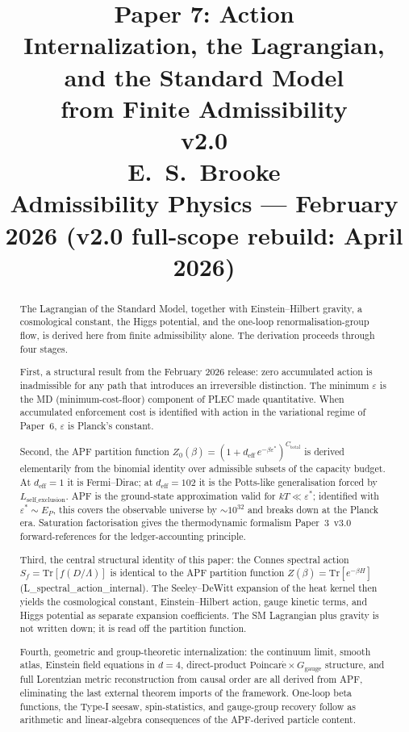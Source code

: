 \documentclass[11pt]{article}
\title{
  \textbf{Paper 7: Action}\\
  \large Internalization, the Lagrangian, and the Standard Model\\
  \large from Finite Admissibility\\
  \normalsize v2.0\\
  \normalsize E.\ S.\ Brooke\\
  Admissibility Physics --- February 2026 (v2.0 full-scope rebuild: April 2026)
}
\author{}
\date{}
\theoremstyle{definition}
\begin{document}
\maketitle

\begin{abstract}
\noindent
The Lagrangian of the Standard Model, together with Einstein--Hilbert gravity, a cosmological constant, the Higgs potential, and the one-loop renormalisation-group flow, is derived here from finite admissibility alone.  The derivation proceeds through four stages.

First, a structural result from the February 2026 release: zero accumulated action is inadmissible for any path that introduces an irreversible distinction.  The minimum $\varepsilon$ is the MD (minimum-cost-floor) component of PLEC made quantitative.  When accumulated enforcement cost is identified with action in the variational regime of Paper~6, $\varepsilon$ is Planck's constant.

Second, the APF partition function $Z_0(\beta) = (1 + d_{\mathrm{eff}} \, e^{-\beta \varepsilon^*})^{C_{\mathrm{total}}}$ is derived elementarily from the binomial identity over admissible subsets of the capacity budget.  At $d_{\mathrm{eff}}=1$ it is Fermi--Dirac; at $d_{\mathrm{eff}}=102$ it is the Potts-like generalisation forced by $L_{\mathrm{self\_exclusion}}$.  APF is the ground-state approximation valid for $kT \ll \varepsilon^*$; identified with $\varepsilon^* \sim E_P$, this covers the observable universe by $\sim\!10^{32}$ and breaks down at the Planck era.  Saturation factorisation gives the thermodynamic formalism Paper~3~v3.0 forward-references for the ledger-accounting principle.

Third, the central structural identity of this paper: the Connes spectral action $S_f = \mathrm{Tr}[f(D/\Lambda)]$ is identical to the APF partition function $Z(\beta) = \mathrm{Tr}[e^{-\beta H}]$ (L\_spectral\_action\_internal).  The Seeley--DeWitt expansion of the heat kernel then yields the cosmological constant, Einstein--Hilbert action, gauge kinetic terms, and Higgs potential as separate expansion coefficients.  The SM Lagrangian plus gravity is not written down; it is read off the partition function.

Fourth, geometric and group-theoretic internalization: the continuum limit, smooth atlas, Einstein field equations in $d=4$, direct-product $\mathrm{Poincar\acute{e}}\times G_{\mathrm{gauge}}$ structure, and full Lorentzian metric reconstruction from causal order are all derived from APF, eliminating the last external theorem imports of the framework.  One-loop beta functions, the Type-I seesaw, spin-statistics, and gauge-group recovery follow as arithmetic and linear-algebra consequences of the APF-derived particle content.


\end{abstract}
\end{document}
